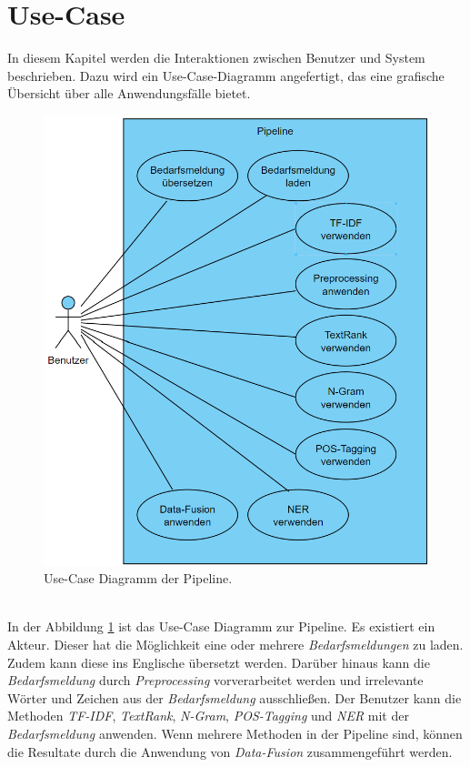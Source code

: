 \newpage
\section{Use-Case}
\label{sec:usecase}
In diesem Kapitel werden die Interaktionen zwischen Benutzer und System beschrieben. Dazu wird ein Use-Case-Diagramm angefertigt, das eine grafische Übersicht über alle Anwendungsfälle bietet.
\begin{figure}[H]
	\centering  
	\includegraphics[width=\linewidth]{Abbildungen/use-case.png}
	\caption{Use-Case Diagramm der Pipeline.}
	\label{fig:usecasediagrammwirklich}
\end{figure}\mbox{} \\
In der Abbildung \ref{fig:usecasediagrammwirklich} ist das Use-Case Diagramm zur Pipeline. Es existiert ein Akteur. Dieser hat die Möglichkeit eine oder mehrere \emph{Bedarfsmeldungen} zu laden. Zudem kann diese ins Englische übersetzt werden. Darüber hinaus kann die \emph{Bedarfsmeldung} durch \emph{Preprocessing} vorverarbeitet werden und irrelevante Wörter und Zeichen aus der \emph{Bedarfsmeldung} ausschließen. Der Benutzer kann die Methoden \emph{TF-IDF}, \emph{TextRank}, \emph{N-Gram}, \emph{POS-Tagging} und \emph{NER} mit der \emph{Bedarfsmeldung} anwenden. Wenn mehrere Methoden in der Pipeline sind, können die Resultate durch die Anwendung von \emph{Data-Fusion} zusammengeführt werden.
